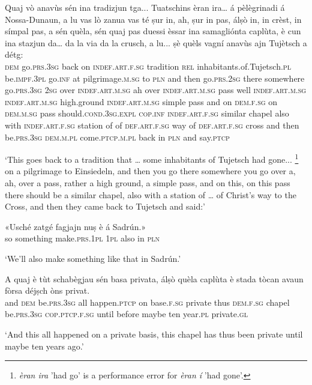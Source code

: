 \begin{linenumbers}
\gll   Quaj vò anavùs sén ina tradizjun tga... Tuatschins èran ira… á pèlègrinadi á Nossa-Dunaun, a lu vas lò zanua vas té ṣur in, ah, ṣur in pas, álṣò in, in crèst, in símpal pas, a sén quèla, sén quaj pas duessi èssar ina samagliónta caplùta, è cun ina stazjun da… da la via da la crusch, a lu... ṣè quèls vagní anavùs ajn Tujètsch a détg: \\
 \textsc{dem} go.\textsc{prs.3sg} back on \textsc{indef.art.f.sg} tradition \textsc{rel}  inhabitants.of.Tujetsch.\textsc{pl} be.\textsc{impf.3pl} go.\textsc{inf} at pilgrimage.\textsc{m.sg} to \textsc{pln} and then go.\textsc{prs.2sg} there somewhere go.\textsc{prs.3sg} \textsc{2sg} over  \textsc{indef.art.m.sg} ah over \textsc{indef.art.m.sg} pass well  \textsc{indef.art.m.sg} \textsc{indef.art.m.sg} high.ground \textsc{indef.art.m.sg} simple pass and on \textsc{dem.f.sg} on \textsc{dem.m.sg} pass should.\textsc{cond.3sg.expl}  \textsc{cop.inf} \textsc{indef.art.f.sg} similar chapel also with \textsc{indef.art.f.sg} station of of  \textsc{def.art.f.sg} way of  \textsc{def.art.f.sg} cross and then be.\textsc{prs.3sg} \textsc{dem.m.pl} come.\textsc{ptcp.m.pl} back in \textsc{pln} and say.\textsc{ptcp}  \\
\end{linenumbers}
\medskip
\glt `This goes back to a tradition that … some inhabitants of Tujetsch had gone... \footnote{\textit{èran ira} 'had go' is a performance error for \textit{èran í} 'had gone'.} on a pilgrimage to Einsiedeln, and then you go there somewhere you go over a, ah, over a pass, rather a high ground, a simple pass, and on this, on this pass there should be a similar chapel, also with a station of … of Christ’s way to the Cross, and then they came back to Tujetsch and said:'
\medskip

\begin{linenumbers}
\gll «Usché zatgé fagjajn nuṣ è á Sadrún.»   \\
so something make.\textsc{prs.1pl} \textsc{1pl} also in \textsc{pln} \ \\
\end{linenumbers}
\medskip
\glt `We’ll also make something like that in Sadrún.'
\medskip

\begin{linenumbers}
\gll  A quaj è tùt schabègjau sén basa privata, álṣò quèla caplùta è stada tòcan avaun fòrsa déjṣch òns privat.  \\
and \textsc{dem} be.\textsc{prs.3sg} all happen.\textsc{ptcp} on base.\textsc{f.sg} private thus  \textsc{dem.f.sg} chapel  be.\textsc{prs.3sg}  \textsc{cop.ptcp.f.sg} until  before maybe ten year.\textsc{pl} private.\textsc{gl}\\
\end{linenumbers}
\medskip
\glt `And this all happened on a private basis, this chapel has thus been private until maybe ten years ago.'
\medskip

